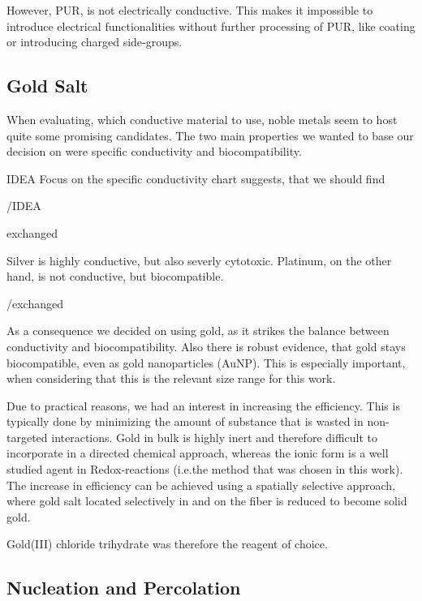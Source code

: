However, PUR, is not electrically conductive. This makes it impossible to introduce electrical functionalities without further processing of PUR, like coating or introducing charged side-groups. 

\subsection{Gold Salt}
\label{subsec:GoldSalt}

When evaluating, which conductive material to use, noble metals seem to
host quite some promising candidates. The two main properties we wanted to
base our decision on were specific conductivity and biocompatibility.

IDEA
Focus on the specific conductivity chart suggests, that we should find 

/IDEA
  
  exchanged

  Silver is highly 
  conductive, but also severly cytotoxic. Platinum, on the other hand, is not conductive, 
  but biocompatible. 
  
  /exchanged


As a consequence we decided on using gold, as it strikes the balance between conductivity and 
biocompatibility. Also there is robust evidence, that gold stays biocompatible, even 
as gold nanoparticles (AuNP). This is especially important, when considering that this is the 
relevant size range for this work. \cite{Liu, Shukla}

Due to practical reasons, we had an interest in increasing the efficiency. This is typically done by minimizing the amount of substance that is wasted in non-targeted interactions. Gold in bulk is highly inert and therefore difficult to incorporate in a directed chemical approach, whereas the ionic form is a well studied agent in Redox-reactions (i.e.the method that was chosen in this work). The increase in efficiency can be achieved using a spatially selective approach, where gold salt located selectively in and on the fiber is reduced to become solid gold.

Gold(III) chloride trihydrate was therefore the reagent of choice. 

\subsection{Nucleation and Percolation}
\label{subsec:Perc}


